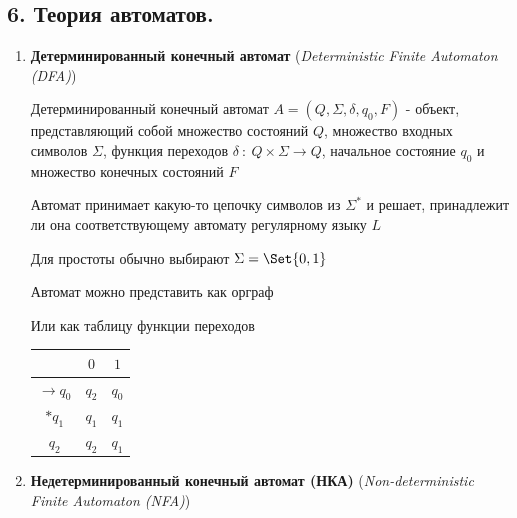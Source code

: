 \documentclass[12pt]{article}
\begin{document}
    \subsection{6. Теория автоматов.}

    \begin{enumerate}
        \item \textbf{Детерминированный конечный автомат} (\textit{Deterministic Finite Automaton (DFA)})

        Детерминированный конечный автомат $A = (Q, \Sigma, \delta, q_0, F)$ - объект, представляющий собой множество состояний $Q$, множество входных символов $\Sigma$,
        функция переходов $\delta \ : \ Q \times \Sigma \to Q$, начальное состояние $q_0$ и множество конечных состояний $F$

        Автомат принимает какую-то цепочку символов из $\Sigma^*$ и решает, принадлежит ли она соответствующему автомату регулярному языку $L$

        Для простоты обычно выбирают $\Sigma = \Set{0, 1}$

        Автомат можно представить как орграф


        Или как таблицу функции переходов

        \begin{tabular}{c|cc}
            & $0$   & $1$   \\
            \hline
            $\to q_0$ & $q_2$ & $q_0$ \\
            \hline
            $*q_1$    & $q_1$ & $q_1$ \\
            \hline
            $q_2$     & $q_2$ & $q_1$
        \end{tabular}

        \item \textbf{Недетерминированный конечный автомат (НКА)} (\textit{Non-deterministic Finite Automaton (NFA)})


\end{enumerate}
\end{document}
